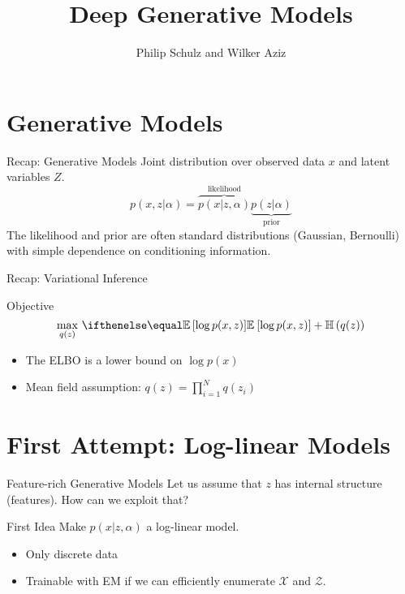 \documentclass[14pt]{beamer}
\title{Deep Generative Models}
\author{Philip Schulz and Wilker Aziz}
\date{}
\begin{document}
\begin{frame}
\maketitle
\end{frame}

\frame{\tableofcontents}

\section{Generative Models}
\frame{\tableofcontents[currentsection]}

\begin{frame}{Recap: Generative Models}
Joint distribution over observed data $ x $ and latent variables $ Z $.
\begin{equation*}
p(x,z|\alpha) = \overbrace{p(x|z,\alpha)}^{\text{likelihood}} \underbrace{p(z|\alpha)}_{\text{prior}}
\end{equation*} 
The likelihood and prior are often standard distributions (Gaussian, Bernoulli) with simple dependence on conditioning
information.
\end{frame}

\begin{frame}{Recap: Variational Inference}
\begin{block}{Objective}
\begin{equation*}
\underset{q(z)}{\max}~\E{\log p(x,z)} + \Ent{q(z)}
\end{equation*}
\begin{itemize}
\item The ELBO is a lower bound on $ \log p(x) $
\item Mean field assumption: $ q(z) = \prod_{i=1}^{N}q(z_{i}) $
\end{itemize}
\end{block}
\end{frame}

\section{First Attempt: Log-linear Models}
\frame{\tableofcontents[currentsection]}

\begin{frame}{Feature-rich Generative Models}
Let us assume that $ z $ has internal structure (features). How can we exploit that?
\begin{block}{First Idea}
Make $ p(x|z,\alpha) $ a log-linear model.
\begin{itemize}
\item Only discrete data
\item Trainable with EM if we can efficiently enumerate $ \mathcal{X} $ and $ \mathcal{Z} $.
\end{itemize}
\end{block}
\end{frame}
\end{document}
